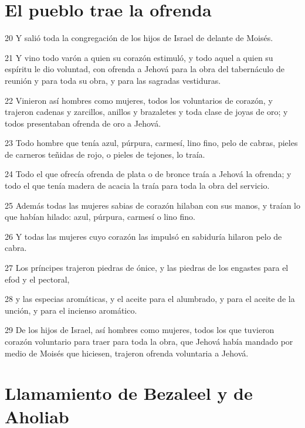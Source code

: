 \section*{El pueblo trae la ofrenda}

\par 20 Y salió toda la congregación de los hijos de Israel de delante de Moisés.
\par 21 Y vino todo varón a quien su corazón estimuló, y todo aquel a quien su espíritu le dio voluntad, con ofrenda a Jehová para la obra del tabernáculo de reunión y para toda su obra, y para las sagradas vestiduras.
\par 22 Vinieron así hombres como mujeres, todos los voluntarios de corazón, y trajeron cadenas y zarcillos, anillos y brazaletes y toda clase de joyas de oro; y todos presentaban ofrenda de oro a Jehová.
\par 23 Todo hombre que tenía azul, púrpura, carmesí, lino fino, pelo de cabras, pieles de carneros teñidas de rojo, o pieles de tejones, lo traía.
\par 24 Todo el que ofrecía ofrenda de plata o de bronce traía a Jehová la ofrenda; y todo el que tenía madera de acacia la traía para toda la obra del servicio.
\par 25 Además todas las mujeres sabias de corazón hilaban con sus manos, y traían lo que habían hilado: azul, púrpura, carmesí o lino fino.
\par 26 Y todas las mujeres cuyo corazón las impulsó en sabiduría hilaron pelo de cabra.
\par 27 Los príncipes trajeron piedras de ónice, y las piedras de los engastes para el efod y el pectoral,
\par 28 y las especias aromáticas, y el aceite para el alumbrado, y para el aceite de la unción, y para el incienso aromático.
\par 29 De los hijos de Israel, así hombres como mujeres, todos los que tuvieron corazón voluntario para traer para toda la obra, que Jehová había mandado por medio de Moisés que hiciesen, trajeron ofrenda voluntaria a Jehová.

\section*{Llamamiento de Bezaleel y de Aholiab}

